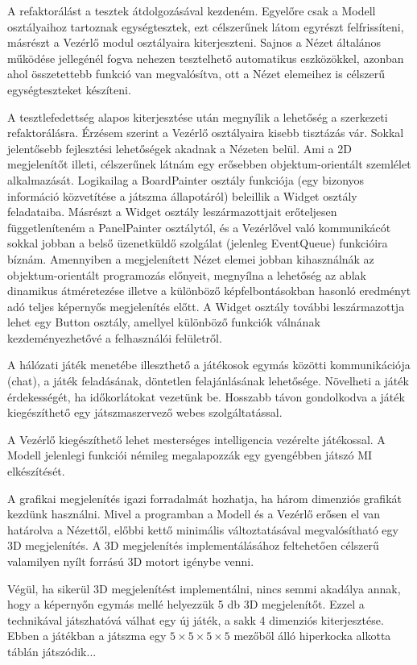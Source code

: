 \documentclass[12pt, twoside]{report}
\begin{document}
A refaktorálást a tesztek átdolgozásával kezdeném. Egyelőre csak a Modell osztályaihoz tartoznak egységtesztek, ezt célszerűnek látom egyrészt felfrissíteni, másrészt a Vezérlő modul osztályaira kiterjeszteni. Sajnos a Nézet általános működése jellegénél fogva nehezen tesztelhető automatikus eszközökkel, azonban ahol összetettebb funkció van megvalósítva, ott a Nézet elemeihez is célszerű egységteszteket készíteni.

A tesztlefedettség alapos kiterjesztése után megnyílik a lehetőség a szerkezeti refaktorálásra. Érzésem szerint a Vezérlő osztályaira kisebb tisztázás vár. Sokkal jelentősebb fejlesztési lehetőségek akadnak a Nézeten belül. Ami a 2D megjelenítőt illeti, célszerűnek látnám egy erősebben objektum-orientált szemlélet alkalmazását. Logikailag a BoardPainter osztály funkciója (egy bizonyos információ közvetítése a játszma állapotáról) beleillik a Widget osztály feladataiba. Másrészt a Widget osztály leszármazottjait erőteljesen függetleníteném a PanelPainter osztálytól, és a Vezérlővel való kommunikácót sokkal jobban a belső üzenetküldő szolgálat (jelenleg EventQueue) funkcióira bíznám. Amennyiben a megjelenített Nézet elemei jobban kihasználnák az objektum-orientált programozás előnyeit, megnyílna a lehetőség az ablak dinamikus átméretezése illetve a különböző képfelbontásokban hasonló eredményt adó teljes képernyős megjelenítés előtt. A Widget osztály további leszármazottja lehet egy Button osztály, amellyel különböző funkciók válnának kezdeményezhetővé a felhasználói felületről.

A hálózati játék menetébe illeszthető a játékosok egymás közötti kommunikációja (chat), a játék feladásának, döntetlen felajánlásának lehetősége. Növelheti a játék érdekességét, ha időkorlátokat vezetünk be. Hosszabb távon gondolkodva a játék kiegészíthető egy játszmaszervező webes szolgáltatással.

A Vezérlő kiegészíthető lehet mesterséges intelligencia vezérelte játékossal. A Modell jelenlegi funkciói némileg megalapozzák egy gyengébben játszó MI elkészítését.

A grafikai megjelenítés igazi forradalmát hozhatja, ha három dimenziós grafikát kezdünk használni. Mivel a programban a Modell és a Vezérlő erősen el van határolva a Nézettől, előbbi kettő minimális változtatásával megvalósítható egy 3D megjelenítés. A 3D megjelenítés implementálásához feltehetően célszerű valamilyen nyílt forrású 3D motort igénybe venni.

Végül, ha sikerül 3D megjelenítést implementálni, nincs semmi akadálya annak, hogy a képernyőn egymás mellé helyezzük 5 db 3D megjelenítőt. Ezzel a technikával játszhatóvá válhat egy új játék, a sakk 4 dimenziós kiterjesztése. Ebben a játékban a játszma egy $5 \times 5 \times 5 \times 5$ mezőből álló hiperkocka alkotta táblán játszódik... 
\end{document}

